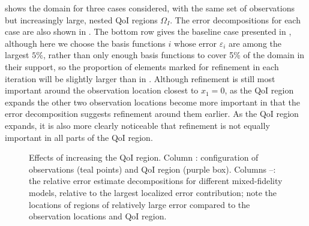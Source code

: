  shows the domain for three cases considered, with the same set of observations but increasingly large, nested QoI regions $\Omega_I$.
The error decompositions for each case are also shown in . The bottom row gives the baseline case presented in , although here we choose the basis functions $i$ whose error $\varepsilon_i$ are among the largest $5\%$, rather than only enough basis functions to cover 5\% of the domain in their support, so the proportion of elements marked for refinement in each iteration will be slightly larger than in .
Although refinement is still most important around the observation location closest to $x_1=0$, as the QoI region expands the other two observation locations become more important in that the error decomposition suggests refinement around them earlier. As the QoI region expands, it is also more clearly noticeable that refinement is not equally important in all parts of the QoI region.

\begin{figure}[htbp]
\centering
\captionsetup{justification=centering}
\captionsetup{justification=centering}
\captionsetup{justification=centering}
\captionsetup{justification=centering}
  \caption{Effects of increasing the QoI region. Column \protect{}: configuration of observations (teal points) and QoI region (purple box). Columns \protect{}--\protect{}: the relative error estimate decompositions for different mixed-fidelity models, relative to the largest localized error contribution; note the locations of regions of relatively large error compared to the observation locations and QoI region.}
  \label{fig:qoiStudy}
\end{figure}

